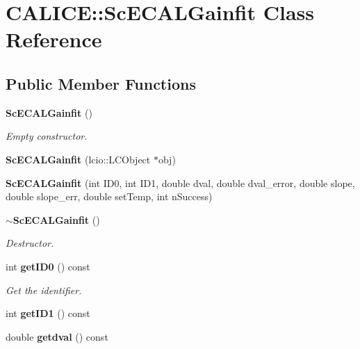 \section{CALICE::ScECALGainfit Class Reference}
\label{classCALICE_1_1ScECALGainfit}
\subsection*{Public Member Functions}
\begin{DoxyCompactItemize}
\item 
{\bf ScECALGainfit} ()\label{classCALICE_1_1ScECALGainfit_a2639beb8f091502e3e0e141b4bb33325}

\begin{DoxyCompactList}\small\item\em Empty constructor. \item\end{DoxyCompactList}\item 
{\bfseries ScECALGainfit} (lcio::LCObject $\ast$obj)\label{classCALICE_1_1ScECALGainfit_a8582a6afd710d87eeb8c9c10ddda2378}

\item 
{\bfseries ScECALGainfit} (int ID0, int ID1, double dval, double dval\_\-error, double slope, double slope\_\-err, double setTemp, int nSuccess)\label{classCALICE_1_1ScECALGainfit_a04407be016e0b1208fe4e5e76adab9a6}

\item 
{\bf $\sim$ScECALGainfit} ()\label{classCALICE_1_1ScECALGainfit_a3297c9edfe996e4636a7cdaef7d5e67a}

\begin{DoxyCompactList}\small\item\em Destructor. \item\end{DoxyCompactList}\item 
int {\bf getID0} () const \label{classCALICE_1_1ScECALGainfit_a640f7d099b60984b8ac0fb0dc2d6b0a7}

\begin{DoxyCompactList}\small\item\em Get the identifier. \item\end{DoxyCompactList}\item 
int {\bfseries getID1} () const \label{classCALICE_1_1ScECALGainfit_abe61b66827315a318e751f96e074caf3}

\item 
double {\bf getdval} () const \label{classCALICE_1_1ScECALGainfit_af6fbc63a9a982f7b560e5a71b51550ce}


\end{DoxyCompactItemize}
